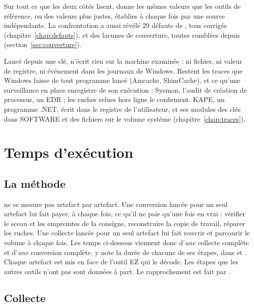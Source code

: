 \documentclass[11pt,a4paper,oneside]{report}
\begin{document}
\begin{note}
Sur tout ce que les deux côtés lisent, \wac{} donne les mêmes valeurs que les
outils de référence, ou des valeurs plus justes, établies à chaque fois par une
source indépendante. La confrontation a aussi révélé 29 défauts de \wac{}, tous
corrigés (chapitre~\ref{chap:defauts}), et des lacunes de couverture,
toutes comblées depuis (section~\ref{sec:couverture}).

Lancé depuis une clé, \wac{} n'écrit rien sur la machine examinée : ni fichier,
ni valeur de registre, ni événement dans les journaux de Windows. Restent les
traces que Windows laisse de tout programme lancé (Amcache, ShimCache), et ce
qu'une surveillance en place enregistre de son exécution : Sysmon, l'audit de
création de processus, un EDR ; les ruches relues hors ligne le confirment.
KAPE, un programme .NET, écrit dans le registre de l'utilisateur, et ses
modules des clés dans SOFTWARE et des fichiers sur le volume système
(chapitre~\ref{chap:traces}).
\end{note}

\chapter{Temps d'exécution}\label{chap:temps}

\section{La méthode}

\wac{} ne se mesure pas artefact par artefact. Une conversion lancée pour un
seul artefact lui fait payer, à chaque fois, ce qu'il ne paie qu'une fois en
vrai : vérifier le sceau et les empreintes de la consigne, reconstruire la copie
de travail, réparer les ruches. Une collecte lancée pour un seul artefact lui
fait rouvrir et parcourir le volume à chaque fois. Les temps ci-dessous viennent
donc d'\emph{une} collecte complète et d'\emph{une} conversion complète.
\wac{} y note la durée de chacune de ses étapes, dans 
et . Chaque artefact est mis en face de l'outil EZ qui
le décode. Les étapes que les autres outils n'ont pas sont données à part.
Le rapprochement est fait par .

\section{Collecte}
\end{document}
